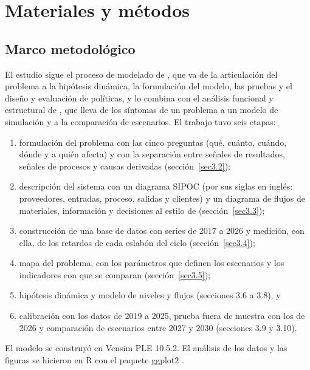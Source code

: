 \documentclass[preprint,12pt,authoryear]{elsarticle}
\begin{document}
\section{Materiales y métodos}
\label{sec3}

\subsection{Marco metodológico}
\label{sec3.1}

El estudio sigue el proceso de modelado de \citet{Sterman2000}, que va de la articulación del problema a la hipótesis dinámica, la formulación del modelo, las pruebas y el diseño y evaluación de políticas, y lo combina con el análisis funcional y estructural de \citet{RubianoVillarreal}, que lleva de los síntomas de un problema a un modelo de simulación y a la comparación de escenarios. El trabajo tuvo seis etapas:
\begin{enumerate}
\item formulación del problema con las cinco preguntas (qué, cuánto, cuándo, dónde y a quién afecta) y con la separación entre señales de resultados, señales de procesos y causas derivadas (sección~\ref{sec3.2});
\item descripción del sistema con un diagrama SIPOC (por sus siglas en inglés: proveedores, entradas, proceso, salidas y clientes) y un diagrama de flujos de materiales, información y decisiones al estilo de \citet{Hollingsworth1995} (sección~\ref{sec3.3});
\item construcción de una base de datos con series de 2017 a 2026 y medición, con ella, de los retardos de cada eslabón del ciclo (sección~\ref{sec3.4});
\item mapa del problema, con los parámetros que definen los escenarios y los indicadores con que se comparan (sección~\ref{sec3.5});
\item hipótesis dinámica y modelo de niveles y flujos (secciones 3.6 a 3.8), y
\item calibración con los datos de 2019 a 2025, prueba fuera de muestra con los de 2026 y comparación de escenarios entre 2027 y 2030 (secciones 3.9 y 3.10).
\end{enumerate}
El modelo se construyó en Vensim PLE 10.5.2. El análisis de los datos y las figuras se hicieron en R \citep{RCoreTeam2025} con el paquete ggplot2 \citep{Wickham2016}.

\end{document}
